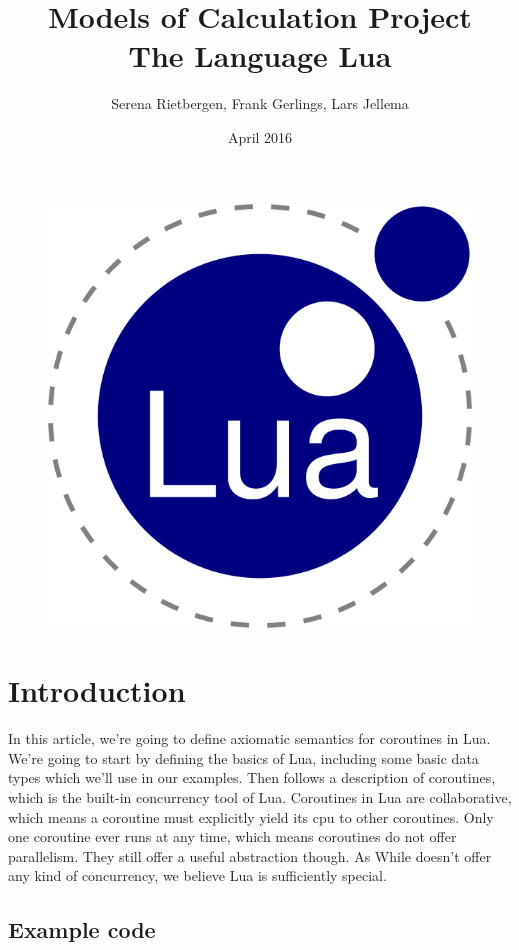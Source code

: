 \documentclass{article}
\title{Models of Calculation Project \\
         The Language Lua}
\author{Serena Rietbergen, Frank Gerlings, Lars Jellema}
\date{April 2016}
\begin{document}
\maketitle
\begin{figure}[!ht]
  \centering
    \includegraphics[scale=0.45]{lua}
\end{figure}
\newpage

\tableofcontents
\newpage

\section{Introduction}
In this article, we're going to define axiomatic semantics for coroutines in
Lua. We're going to start by defining the basics of Lua, including some basic
data types which we'll use in our examples. Then follows a description of
coroutines, which is the built-in concurrency tool of Lua. Coroutines in Lua are
collaborative, which means a coroutine must explicitly yield its cpu to other
coroutines. Only one coroutine ever runs at any time, which means coroutines do
not offer parallelism. They still offer a useful abstraction though. As While
doesn't offer any kind of concurrency, we believe Lua is sufficiently special.

\subsection{Example code}

\end{document}
